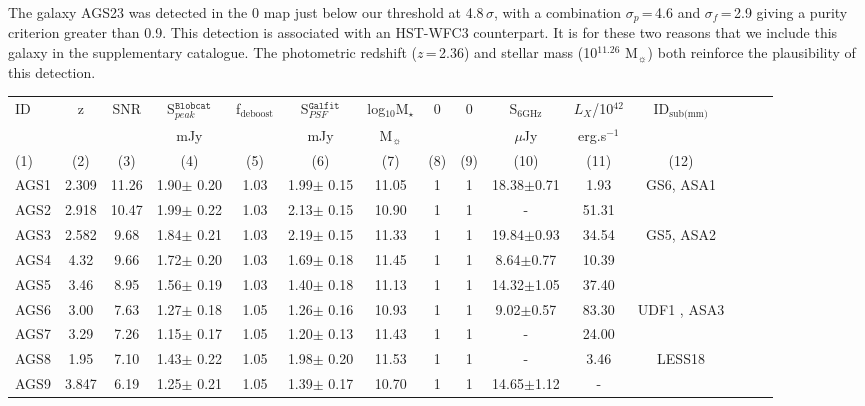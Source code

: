 \documentclass[longauth]{aa}
\begin{document}
The galaxy AGS23 was detected in the 0 map just below our threshold at 4.8\,$\sigma$, with a combination $\sigma_p$\,=\,4.6 and $\sigma_f$\,=\,2.9 giving a purity criterion greater than 0.9. This detection is associated with an HST-WFC3 counterpart. It is for these two reasons that we include this galaxy in the supplementary catalogue. The photometric redshift ($z$\,=\,2.36) and stellar mass (10$^{11.26}$ M$_\sun$) both reinforce the plausibility of this detection.

\begin{table*}\footnotesize 
\centering          
\begin{tabular}{l  c c c c c c c c c c c c c c }   
\hline    
ID & z & SNR&S$_{peak}^{\texttt{Blobcat}}$& f$_\text{deboost}$& S$_{PSF}^{\texttt{Galfit}}$&  log$_{10}$M$_\star$&0\arcsec60&0\arcsec29&S$_\text{6GHz}$ &$L_X$/10$^{42}$& ID$_{\text{sub(mm)}}$\\
&  & &mJy&&mJy &M$_\sun$&&&$\mu$Jy& erg.s$^{-1}$&\\
(1)&(2)&(3)&(4)&(5)&(6)&(7)&(8)&(9)&(10)&(11)&(12)\\
\hline                  
\hline    
AGS1 	&  2.309 	&11.26 	& 1.90$\pm$ 0.20 		&1.03& 1.99$\pm$ 0.15 & 11.05 	&  1 & 1 & 18.38$\pm$0.71 	& 1.93 	&GS6, ASA1	\\
 AGS2 	&  2.918 	&10.47 	& 1.99$\pm$ 0.22 		&1.03& 2.13$\pm$ 0.15 & 10.90 	&  1 & 1 &  - 				& 51.31 	&			\\
 AGS3	&  2.582 	&9.68 	& 1.84$\pm$ 0.21 		&1.03& 2.19$\pm$ 0.15 & 11.33 	&  1 & 1 & 19.84$\pm$0.93 	& 34.54 	&GS5, ASA2  	\\
 AGS4   	&  4.32 	& 9.66 	& 1.72$\pm$ 0.20 		&1.03&1.69$\pm$ 0.18 & 11.45 	&  1 & 1 & 8.64$\pm$0.77 	& 10.39 	&			\\
 AGS5   	&  3.46 	& 8.95 	& 1.56$\pm$ 0.19 		&1.03& 1.40$\pm$ 0.18 & 11.13 	&  1 & 1 & 14.32$\pm$1.05 	& 37.40 	&         	        \\
 AGS6    	&  3.00 	&7.63 	& 1.27$\pm$ 0.18 		&1.05& 1.26$\pm$ 0.16 & 10.93 	&  1 & 1 & 9.02$\pm$0.57 	& 83.30  	& UDF1 , ASA3	\\
 AGS7   	&  3.29 	&7.26 	& 1.15$\pm$ 0.17 		&1.05& 1.20$\pm$ 0.13 & 11.43 	&  1 & 1 & - 				& 24.00 	&			\\
 AGS8   	&  1.95 	&7.10 	& 1.43$\pm$ 0.22 		&1.05& 1.98$\pm$ 0.20 & 11.53 	&  1 & 1 & -  				& 3.46 	&   LESS18	\\
 AGS9  	&  3.847 	&6.19 	& 1.25$\pm$ 0.21 		&1.05& 1.39$\pm$ 0.17 & 10.70 	&  1 & 1 & 14.65$\pm$1.12	& - 		&			\\

\end{tabular}
\end{table*}
\end{document}
